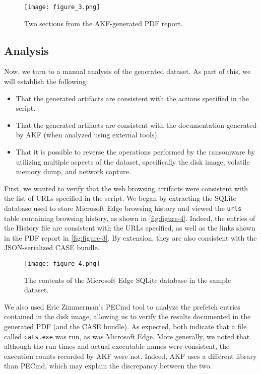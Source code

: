 \begin{figure}[htbp]
\centering
\texttt{[image: figure\_3.png]}
\caption{Two sections from the AKF-generated PDF
report.}\label{fig:figure-3}
\end{figure}

\subsection{Analysis}\label{analysis}

Now, we turn to a manual analysis of the generated dataset. As part of
this, we will establish the following:

\begin{itemize}
\item
  That the generated artifacts are consistent with the actions specified
  in the script.
\item
  That the generated artifacts are consistent with the documentation
  generated by AKF (when analyzed using external tools).
\item
  That it is possible to reverse the operations performed by the
  ransomware by utilizing multiple aspects of the dataset, specifically
  the disk image, volatile memory dump, and network capture.
\end{itemize}

First, we wanted to verify that the web browsing artifacts were
consistent with the list of URLs specified in the script. We began by
extracting the SQLite database used to store Microsoft Edge browsing
history and viewed the \passthrough{\lstinline!urls!} table containing
browsing history, as shown in \autoref{fig:figure-4}. Indeed, the
entries of the History file are consistent with the URLs specified, as
well as the links shown in the PDF report in \autoref{fig:figure-3}. By
extension, they are also consistent with the JSON-serialized CASE
bundle.

\begin{figure}[htbp]
\centering
\texttt{[image: figure\_4.png]}
\caption{The contents of the Microsoft Edge SQLite database in the
sample dataset.}\label{fig:figure-4}
\end{figure}

We also used Eric Zimmerman's PECmd tool to analyze the prefetch entries
contained in the disk image, allowing us to verify the results
documented in the generated PDF (and the CASE bundle). As expected, both
indicate that a file called \passthrough{\lstinline!cats.exe!} was run,
as was Microsoft Edge. More generally, we noted that although the run
times and actual executable names were consistent, the execution counts
recorded by AKF were not. Indeed, AKF uses a different library than
PECmd, which may explain the discrepancy between the two.

